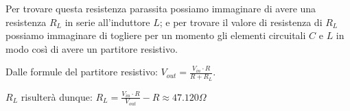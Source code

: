 \documentclass{article}
\begin{document}
Per trovare questa resistenza parassita possiamo immaginare di avere una resistenza $R_L$ in serie all'induttore $L$; e per trovare il valore di resistenza di $R_L$ possiamo immaginare di togliere per un momento gli elementi circuitali $C$ e $L$ in modo così di avere un partitore resistivo.

Dalle formule del partitore resistivo: \(V_{out} = \frac{V_{in} \cdot R}{R + R_L}\).

$R_L$ risulterà dunque: \(R_L = \frac{V_{in} \cdot R }{V_{out}} - R \approx 47.120 \Omega \)
\end{document}
